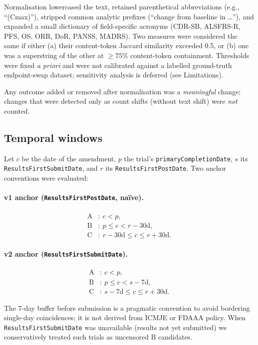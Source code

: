 \documentclass[11pt,a4paper]{article}
\begin{document}
Normalisation lowercased the text, retained parenthetical abbreviations
(e.g., ``(Cmax)''), stripped common analytic prefixes (``change from
baseline in \ldots''), and expanded a small dictionary of
field-specific acronyms (CDR-SB, ALSFRS-R, PFS, OS, ORR, DoR, PANSS,
MADRS). Two measures were considered the same if either
(a) their content-token Jaccard similarity exceeded 0.5, or
(b) one was a superstring of the other at $\geq 75\%$
content-token containment. Thresholds were fixed \emph{a priori} and
were not calibrated against a labelled ground-truth endpoint-swap
dataset; sensitivity analysis is deferred (see Limitations).

Any outcome added or removed after normalisation was a
\emph{meaningful} change; changes that were detected only as count
shifts (without text shift) were \emph{not} counted.

\subsection{Temporal windows}
Let $c$ be the date of the amendment,
$p$ the trial's \texttt{primaryCompletionDate},
$s$ its \texttt{ResultsFirstSubmitDate}, and
$r$ its \texttt{ResultsFirstPostDate}.
Two anchor conventions were evaluated:

\paragraph{v1 anchor (\texttt{ResultsFirstPostDate}, na\"ive).}
\begin{align*}
    \text{A} &:\ c < p, \\
    \text{B} &:\ p \leq c < r-30\text{d}, \\
    \text{C} &:\ r-30\text{d} \leq c \leq r+30\text{d}.
\end{align*}

\paragraph{v2 anchor (\texttt{ResultsFirstSubmitDate}).}
\begin{align*}
    \text{A} &:\ c < p, \\
    \text{B} &:\ p \leq c < s-7\text{d}, \\
    \text{C} &:\ s-7\text{d} \leq c \leq r+30\text{d}.
\end{align*}

The 7-day buffer before submission is a pragmatic convention to avoid
bordering single-day coincidences; it is not derived from ICMJE or
FDAAA policy. When \texttt{ResultsFirstSubmitDate} was unavailable
(results not yet submitted) we conservatively treated such trials as
uncensored B candidates.
\end{document}
